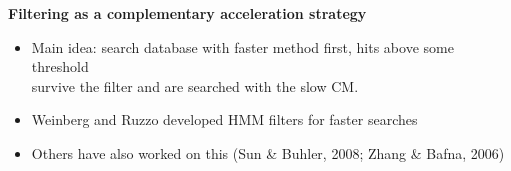 \documentclass[landscape]{slides}
\begin{document}
\begin{slide}

\begin{center}
\textbf{Filtering as a complementary acceleration strategy}
\end{center}

\small
\begin{itemize}
\item
  Main idea: search database with faster method first, hits above some threshold \\ survive the filter and are searched with the slow CM.
\item
  Weinberg and Ruzzo developed HMM filters for faster searches
\item
  Others have also worked on this (Sun \& Buhler, 2008; Zhang \&
  Bafna, 2006)
\end{itemize}

\vfill

\end{slide}
\end{document}
